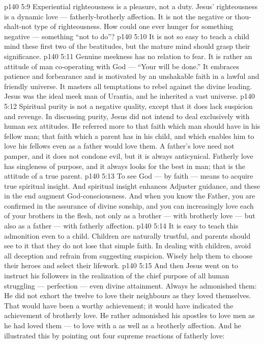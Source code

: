 \vs p140 5:9 Experiential righteousness is a pleasure, not a duty. Jesus’ righteousness is a dynamic love --- fatherly\hyp{}brotherly affection. It is not the negative or thou\hyp{}shalt\hyp{}not type of righteousness. How could one ever hunger for something negative --- something “not to do”?
\vs p140 5:10 \pc It is not so easy to teach a child mind these first two of the beatitudes, but the mature mind should grasp their significance.
\vs p140 5:11 \bibnobreakspace {} Genuine meekness has no relation to fear. It is rather an attitude of man co\hyp{}operating with God --- “Your will be done.” It embraces patience and forbearance and is motivated by an unshakable faith in a lawful and friendly universe. It masters all temptations to rebel against the divine leading. Jesus was the ideal meek man of Urantia, and he inherited a vast universe.
\vs p140 5:12 \bibnobreakspace {} Spiritual purity is not a negative quality, except that it does lack suspicion and revenge. In discussing purity, Jesus did not intend to deal exclusively with human sex attitudes. He referred more to that faith which man should have in his fellow man; that faith which a parent has in his child, and which enables him to love his fellows even as a father would love them. A father’s love need not pamper, and it does not condone evil, but it is always anticynical. Fatherly love has singleness of purpose, and it always looks for the best in man; that is the attitude of a true parent.
\vs p140 5:13 To see God --- by faith --- means to acquire true spiritual insight. And spiritual insight enhances Adjuster guidance, and these in the end augment God\hyp{}consciousness. And when you know the Father, you are confirmed in the assurance of divine sonship, and you can increasingly love each of your brothers in the flesh, not only as a brother --- with brotherly love --- but also as a father --- with fatherly affection.
\vs p140 5:14 It is easy to teach this admonition even to a child. Children are naturally trustful, and parents should see to it that they do not lose that simple faith. In dealing with children, avoid all deception and refrain from suggesting suspicion. Wisely help them to choose their heroes and select their lifework.
\vs p140 5:15 \pc And then Jesus went on to instruct his followers in the realization of the chief purpose of all human struggling --- perfection --- even divine attainment. Always he admonished them:  He did not exhort the twelve to love their neighbours as they loved themselves. That would have been a worthy achievement; it would have indicated the achievement of brotherly love. He rather admonished his apostles to love men as he had loved them --- to love with a  as well as a brotherly affection. And he illustrated this by pointing out four supreme reactions of fatherly love:
